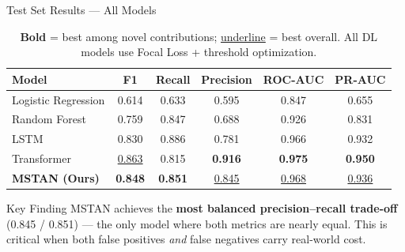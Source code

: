 \documentclass[aspectratio=169,11pt]{beamer}
\begin{document}
\begin{frame}{Test Set Results — All Models}
\begin{table}[h]
\centering
\small
\begin{tabular}{lccccc}
\toprule
\textbf{Model} & \textbf{F1} & \textbf{Recall} & \textbf{Precision} & \textbf{ROC-AUC} & \textbf{PR-AUC} \\
\midrule
Logistic Regression & 0.614 & 0.633 & 0.595 & 0.847 & 0.655 \\
Random Forest & 0.759 & 0.847 & 0.688 & 0.926 & 0.831 \\
LSTM & 0.830 & 0.886 & 0.781 & 0.966 & 0.932 \\
Transformer & \underline{0.863} & 0.815 & \textbf{0.916} & \textbf{0.975} & \textbf{0.950} \\
\textbf{MSTAN (Ours)} & \textbf{0.848} & \textbf{0.851} & \underline{0.845} & \underline{0.968} & \underline{0.936} \\
\bottomrule
\end{tabular}
\caption*{\textbf{Bold} = best among novel contributions; \underline{underline} = best overall. All DL models use Focal Loss + threshold optimization.}
\end{table}
\vspace{4pt}
\begin{block}{Key Finding}
MSTAN achieves the \textbf{most balanced precision--recall trade-off} (0.845 / 0.851) — the only model where both metrics are nearly equal. This is critical when both false positives \emph{and} false negatives carry real-world cost.
\end{block}
\end{frame}
\end{document}
